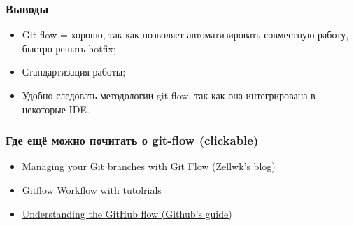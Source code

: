 \documentclass[]{beamer}
\begin{document}
\begin{frame} \frametitle{Выводы}
\begin{itemize}
    \item Git-flow = хорошо, так как позволяет автоматизировать совместную работу, быстро решать hotfix;
    \item Стандартизация работы;
    \item Удобно следовать методологии git-flow, так как она интегрирована в некоторые IDE.
\end{itemize}
\end{frame}

\begin{frame} \frametitle{Где ещё можно почитать о git-flow (clickable)}
\begin{itemize}
    \item \href{https://zellwk.com/blog/git-flow/}{Managing your Git branches with Git Flow (Zellwk's blog)}
    \item \href{https://www.atlassian.com/git/tutorials/comparing-workflows/gitflow-workflow}{Gitflow Workflow with tutolrials}
    \item \href{https://guides.github.com/introduction/flow/}{Understanding the GitHub flow (Github's guide)}
\end{itemize}
\end{frame}
\end{document}
